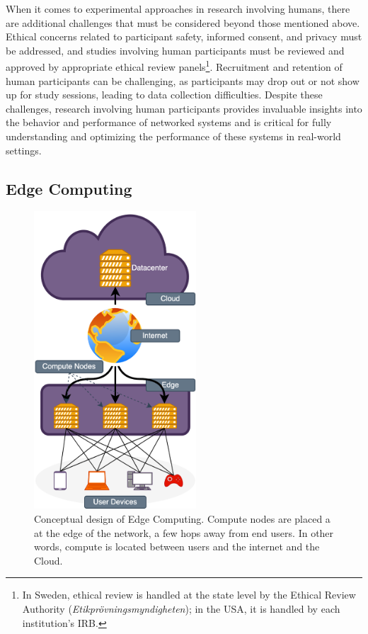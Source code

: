 When it comes to experimental approaches in research involving humans, there are additional challenges that must be considered beyond those mentioned above.
Ethical concerns related to participant safety, informed consent, and privacy must be addressed, and studies involving human participants must be reviewed and approved by appropriate ethical review panels\footnote{%
    In Sweden, ethical review is handled at the state level by the Ethical Review Authority (\emph{Etikprövningsmyndigheten}); in the \acs{USA}, it is handled by each institution's \gls{IRB}.
}.
Recruitment and retention of human participants can be challenging, as participants may drop out or not show up for study sessions, leading to data collection difficulties.
Despite these challenges, research involving human participants provides invaluable insights into the behavior and performance of networked systems and is critical for fully understanding and optimizing the performance of these systems in real-world settings.

\subsection{Edge Computing}

\begin{figure}
    \centering
    \includegraphics[height=30em]{figures/edgecomputing}
    \caption{%
        Conceptual design of Edge Computing.
        Compute nodes are placed a at the edge of the network, a few hops away from end users.
        In other words, compute is located between users and the internet and the Cloud.
    }\label{fig:edgecomputing}
\end{figure}



